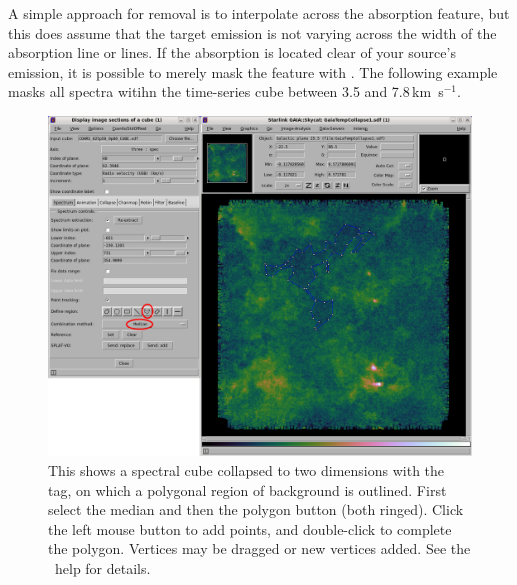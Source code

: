 \documentclass[11pt,oneside,chapters]{starlink}
\newcommand{\kms}{\mbox{$\,$km~s$^{-1}$}}   %
\newcommand{\kms}{\,km~s$^{-1}$}   %
\begin{document}
A simple approach for removal is to interpolate across the absorption
feature, but this does assume that the target emission is not varying
across the width of the absorption line or lines.  If the absorption
is located clear of your source's emission, it is possible to merely
mask the feature with \chpix.  The following example masks all spectra
witihn the time-series cube  between 3.5 and 7.8\kms.

\begin{terminalv}
\end{terminalv}

\begin{figure}[h!] \begin{center}
\includegraphics[width=0.95\linewidth]{sc20_refspec_gaia_polygon}
\caption[Using \gaia\ to define background regions]{\label{fig:GAIA_Polygon}
  This shows a spectral cube collapsed to two dimensions with the
   tag, on which a polygonal region of background
  is outlined. First select the median 
  and then the polygon  button (both ringed).
  Click the left mouse button to add points, and double-click to
  complete the polygon.  Vertices may be dragged or new vertices
  added. See the \gaia\ help for details.}
\end{center}
\end{figure}
\end{document}
